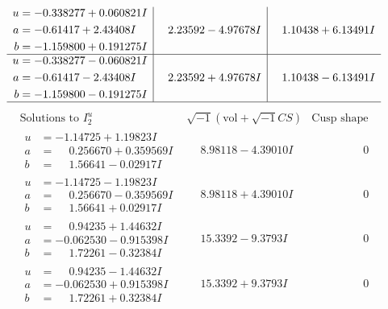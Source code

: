 \documentclass[1p]{elsarticle_modified}
\theoremstyle{definition}
\newcommand{\I}{\sqrt{-1}}
\begin{document}
$$\begin{array}{c|c|c}
\begin{aligned}
u &= -0.338277 + 0.060821 I \\
a &= -0.61417 + 2.43408 I \\
b &= -1.159800 + 0.191275 I\end{aligned}
 & \phantom{-}2.23592 - 4.97678 I & \phantom{-}1.10438 + 6.13491 I \\ \hline\begin{aligned}
u &= -0.338277 - 0.060821 I \\
a &= -0.61417 - 2.43408 I \\
b &= -1.159800 - 0.191275 I\end{aligned}
 & \phantom{-}2.23592 + 4.97678 I & \phantom{-}1.10438 - 6.13491 I\\
 \hline 
 \end{array}$$\newpage$$\begin{array}{c|c|c}  
\text{Solutions to }I^u_{2}& \I (\text{vol} + \sqrt{-1}CS) & \text{Cusp shape}\\
 \hline 
\begin{aligned}
u &= -1.14725 + 1.19823 I \\
a &= \phantom{-}0.256670 + 0.359569 I \\
b &= \phantom{-}1.56641 - 0.02917 I\end{aligned}
 & \phantom{-}8.98118 - 4.39010 I & \phantom{-0.000000 } 0 \\ \hline\begin{aligned}
u &= -1.14725 - 1.19823 I \\
a &= \phantom{-}0.256670 - 0.359569 I \\
b &= \phantom{-}1.56641 + 0.02917 I\end{aligned}
 & \phantom{-}8.98118 + 4.39010 I & \phantom{-0.000000 } 0 \\ \hline\begin{aligned}
u &= \phantom{-}0.94235 + 1.44632 I \\
a &= -0.062530 - 0.915398 I \\
b &= \phantom{-}1.72261 - 0.32384 I\end{aligned}
 & \phantom{-}15.3392 - 9.3793 I & \phantom{-0.000000 } 0 \\ \hline\begin{aligned}
u &= \phantom{-}0.94235 - 1.44632 I \\
a &= -0.062530 + 0.915398 I \\
b &= \phantom{-}1.72261 + 0.32384 I\end{aligned}
 & \phantom{-}15.3392 + 9.3793 I & \phantom{-0.000000 } 0 \\ \hline\begin{aligned}

\end{aligned}
\end{array}$$
\end{document}
